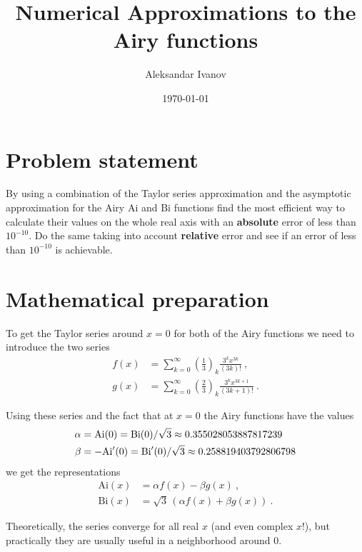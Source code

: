 \documentclass[10pt,a4paper,twocolumn]{article}
\newcommand{\Ai}{\mathrm{Ai}}
\newcommand{\Bi}{\mathrm{Bi}}
\begin{document}
\title{Numerical Approximations to the Airy functions}
\author{Aleksandar Ivanov}
\date{\today}
\maketitle

\section{Problem statement}

By using a combination of the Taylor series approximation and the asymptotic approximation for the Airy $\Ai$ and $\Bi$ functions find the most efficient way to calculate their values on the whole real axis with an \textbf{absolute} error of less than $10^{-10}$. Do the same taking into account \textbf{relative} error and see if an error of less than $10^{-10}$ is achievable.

\section{Mathematical preparation}

To get the Taylor series around $x=0$ for both of the Airy functions we need to introduce the two series
%
\begin{align}
  f(x) &= \sum_{k=0}^\infty
  \left(\frac{1}{3}\right)_k \frac{3^k x^{3k}}{(3k)!} \>, \\
  g(x) &= \sum_{k=0}^\infty
  \left(\frac{2}{3}\right)_k \frac{3^k x^{3k+1}}{(3k+1)!} \>.
\end{align}

Using these series and the fact that at $x=0$ the Airy functions have the values
%
\begin{align}
\alpha &= \Ai(0) = \Bi(0)/\sqrt{3}\approx 0.355028053887817239 \notag\\
\beta &= -\Ai'(0) = \Bi'(0)/\sqrt{3}\approx 0.258819403792806798 \notag
\end{align}
%
we get the representations
%
\begin{align}
  \Ai(x) &= \alpha f(x) - \beta g(x)\>, \\
  \Bi(x) &= \sqrt{3}\, \left(\alpha f (x) + \beta g(x) \right)\>.
\end{align}

Theoretically, the series converge for all real $x$ (and even complex $x$!), but practically they are usually useful in a neighborhood around $0$.
\end{document}

